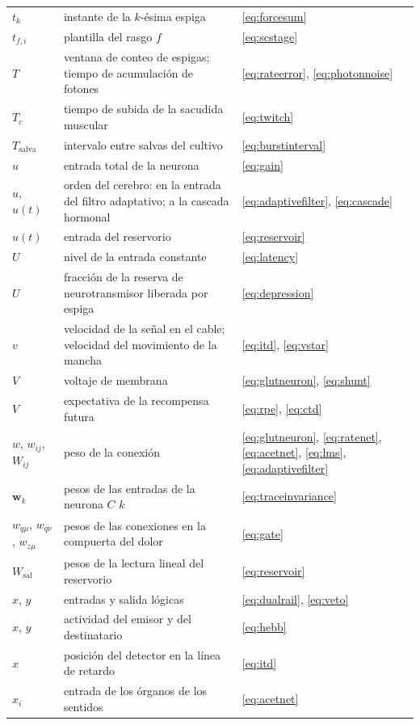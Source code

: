 \begin{center}
\begin{longtable}{>{\raggedright}p{2.0cm}>{\raggedright}p{9.6cm}>{\raggedright\arraybackslash}p{2.4cm}}
$t_k$ & instante de la $k$-ésima espiga & \eqref{eq:forcesum} \\
$t_{f,i}$ & plantilla del rasgo $f$ & \eqref{eq:scstage} \\
$T$ & ventana de conteo de espigas; tiempo de acumulación de fotones & \eqref{eq:rateerror}, \eqref{eq:photonnoise} \\
$T_c$ & tiempo de subida de la sacudida muscular & \eqref{eq:twitch} \\
$T_{\text{salva}}$ & intervalo entre salvas del cultivo & \eqref{eq:burstinterval} \\
$u$ & entrada total de la neurona & \eqref{eq:gain} \\
$u$, $u(t)$ & orden del cerebro: en la entrada del filtro adaptativo; a la cascada hormonal & \eqref{eq:adaptivefilter}, \eqref{eq:cascade} \\
$u(t)$ & entrada del reservorio & \eqref{eq:reservoir} \\
$U$ & nivel de la entrada constante & \eqref{eq:latency} \\
$U$ & fracción de la reserva de neurotransmisor liberada por espiga & \eqref{eq:depression} \\
$v$ & velocidad de la señal en el cable; velocidad del movimiento de la mancha & \eqref{eq:itd}, \eqref{eq:vstar} \\
$V$ & voltaje de membrana & \eqref{eq:glutneuron}, \eqref{eq:shunt} \\
$V$ & expectativa de la recompensa futura & \eqref{eq:rpe}, \eqref{eq:ctd} \\
$w$, $w_{ij}$, $W_{ij}$ & peso de la conexión & \eqref{eq:glutneuron}, \eqref{eq:ratenet}, \eqref{eq:acetnet}, \eqref{eq:lms}, \eqref{eq:adaptivefilter} \\
$\mathbf w_k$ & pesos de las entradas de la neurona $C$ $k$ & \eqref{eq:traceinvariance} \\
$w_{q\mu}$, $w_{q\nu}$, $w_{z\mu}$ & pesos de las conexiones en la compuerta del dolor & \eqref{eq:gate} \\
$W_{\text{sal}}$ & pesos de la lectura lineal del reservorio & \eqref{eq:reservoir} \\
$x$, $y$ & entradas y salida lógicas & \eqref{eq:dualrail}, \eqref{eq:veto} \\
$x$, $y$ & actividad del emisor y del destinatario & \eqref{eq:hebb} \\
$x$ & posición del detector en la línea de retardo & \eqref{eq:itd} \\
$x_i$ & entrada de los órganos de los sentidos & \eqref{eq:acetnet} \\

\end{longtable}
\end{center}
